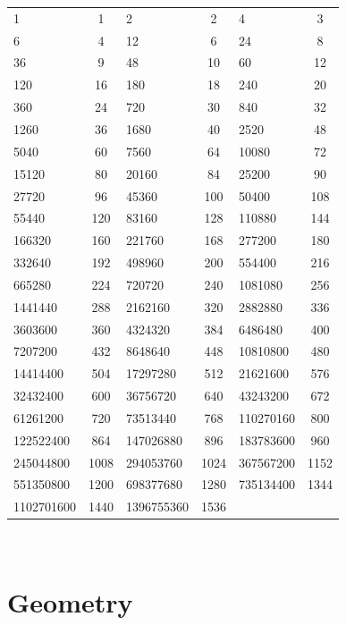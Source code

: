 \documentclass[10pt, twocolumn]{article}
\begin{document}
\begin{flushleft}
\begin{center}
{\begin{tabu}[H]{|a|c|a|c|a|c|}
1 & 1 & 2 & 2 & 4 & 3\\
6 & 4 & 12 & 6 & 24 & 8\\
36 & 9 & 48 & 10 & 60 & 12\\
120 & 16 & 180 & 18 & 240 & 20\\
360 & 24 & 720 & 30 & 840 & 32\\
1260 & 36 & 1680 & 40 & 2520 & 48\\
5040 & 60 & 7560 & 64 & 10080 & 72\\
15120 & 80 & 20160 & 84 & 25200 & 90\\
27720 & 96 & 45360 & 100 & 50400 & 108\\
55440 & 120 & 83160 & 128 & 110880 & 144\\
166320 & 160 & 221760 & 168 & 277200 & 180\\
332640 & 192 & 498960 & 200 & 554400 & 216\\
665280 & 224 & 720720 & 240 & 1081080 & 256\\
1441440 & 288 & 2162160 & 320 & 2882880 & 336\\
3603600 & 360 & 4324320 & 384 & 6486480 & 400\\
7207200 & 432 & 8648640 & 448 & 10810800 & 480\\
14414400 & 504 & 17297280 & 512 & 21621600 & 576\\
32432400 & 600 & 36756720 & 640 & 43243200 & 672\\
61261200 & 720 & 73513440 & 768 & 110270160 & 800\\
122522400 & 864 & 147026880 & 896 & 183783600 & 960\\
245044800 & 1008 & 294053760 & 1024 & 367567200 & 1152\\
551350800 & 1200 & 698377680 & 1280 & 735134400 & 1344\\
1102701600 & 1440 & 1396755360 & 1536\\

\end{tabu}}\\[0.5cm]
\end{center}


\section{Geometry}


\end{flushleft}
\end{document}
